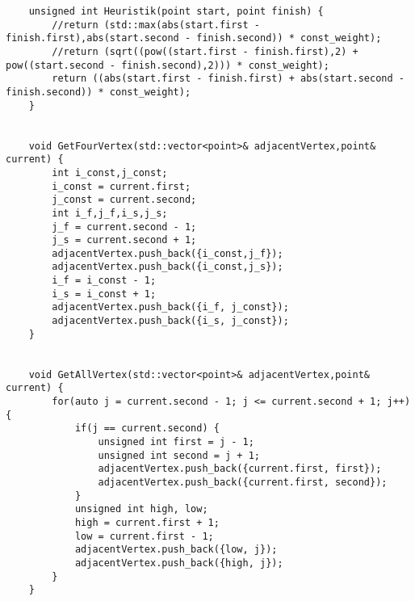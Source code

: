 \documentclass[12pt]{article}
\begin{document}
\begin{verbatim}
    unsigned int Heuristik(point start, point finish) {
        //return (std::max(abs(start.first - finish.first),abs(start.second - finish.second)) * const_weight);
        //return (sqrt((pow((start.first - finish.first),2) + pow((start.second - finish.second),2))) * const_weight);
        return ((abs(start.first - finish.first) + abs(start.second - finish.second)) * const_weight);
    }


    void GetFourVertex(std::vector<point>& adjacentVertex,point& current) {
        int i_const,j_const;
        i_const = current.first;
        j_const = current.second;
        int i_f,j_f,i_s,j_s;
        j_f = current.second - 1;
        j_s = current.second + 1;
        adjacentVertex.push_back({i_const,j_f});
        adjacentVertex.push_back({i_const,j_s});
        i_f = i_const - 1;
        i_s = i_const + 1;
        adjacentVertex.push_back({i_f, j_const});
        adjacentVertex.push_back({i_s, j_const});
    }


    void GetAllVertex(std::vector<point>& adjacentVertex,point& current) {
        for(auto j = current.second - 1; j <= current.second + 1; j++) {
            if(j == current.second) {
                unsigned int first = j - 1;
                unsigned int second = j + 1;
                adjacentVertex.push_back({current.first, first});
                adjacentVertex.push_back({current.first, second});
            }
            unsigned int high, low;
            high = current.first + 1;
            low = current.first - 1;
            adjacentVertex.push_back({low, j});
            adjacentVertex.push_back({high, j});
        }
    }



\end{verbatim}
\end{document}
